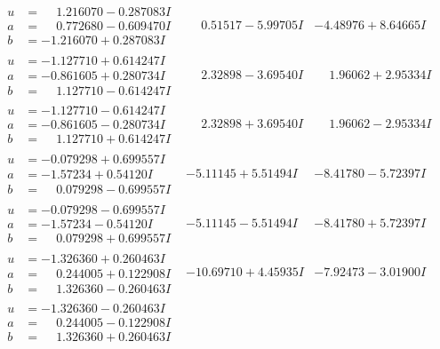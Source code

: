 \documentclass[1p]{elsarticle_modified}
\theoremstyle{definition}
\begin{document}
$$\begin{array}{c|c|c}
\begin{aligned}
u &= \phantom{-}1.216070 - 0.287083 I \\
a &= \phantom{-}0.772680 - 0.609470 I \\
b &= -1.216070 + 0.287083 I\end{aligned}
 & \phantom{-}0.51517 - 5.99705 I & -4.48976 + 8.64665 I \\ \hline\begin{aligned}
u &= -1.127710 + 0.614247 I \\
a &= -0.861605 + 0.280734 I \\
b &= \phantom{-}1.127710 - 0.614247 I\end{aligned}
 & \phantom{-}2.32898 - 3.69540 I & \phantom{-}1.96062 + 2.95334 I \\ \hline\begin{aligned}
u &= -1.127710 - 0.614247 I \\
a &= -0.861605 - 0.280734 I \\
b &= \phantom{-}1.127710 + 0.614247 I\end{aligned}
 & \phantom{-}2.32898 + 3.69540 I & \phantom{-}1.96062 - 2.95334 I \\ \hline\begin{aligned}
u &= -0.079298 + 0.699557 I \\
a &= -1.57234 + 0.54120 I \\
b &= \phantom{-}0.079298 - 0.699557 I\end{aligned}
 & -5.11145 + 5.51494 I & -8.41780 - 5.72397 I \\ \hline\begin{aligned}
u &= -0.079298 - 0.699557 I \\
a &= -1.57234 - 0.54120 I \\
b &= \phantom{-}0.079298 + 0.699557 I\end{aligned}
 & -5.11145 - 5.51494 I & -8.41780 + 5.72397 I \\ \hline\begin{aligned}
u &= -1.326360 + 0.260463 I \\
a &= \phantom{-}0.244005 + 0.122908 I \\
b &= \phantom{-}1.326360 - 0.260463 I\end{aligned}
 & -10.69710 + 4.45935 I & -7.92473 - 3.01900 I \\ \hline\begin{aligned}
u &= -1.326360 - 0.260463 I \\
a &= \phantom{-}0.244005 - 0.122908 I \\
b &= \phantom{-}1.326360 + 0.260463 I\end{aligned}

\end{array}$$
\end{document}

